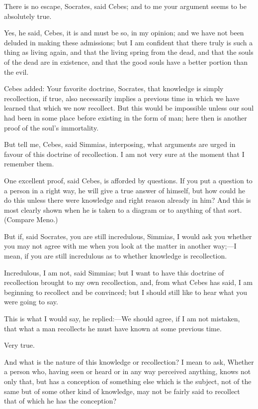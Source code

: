 There is no escape, Socrates, said Cebes; and to me your argument seems to
be absolutely true.

Yes, he said, Cebes, it is and must be so, in my opinion; and we have not
been deluded in making these admissions; but I am confident that there
truly is such a thing as living again, and that the living spring from the
dead, and that the souls of the dead are in existence, and that the good
souls have a better portion than the evil.

Cebes added: Your favorite doctrine, Socrates, that knowledge is simply
recollection, if true, also necessarily implies a previous time in which
we have learned that which we now recollect. But this would be impossible
unless our soul had been in some place before existing in the form of man;
here then is another proof of the soul's immortality.

But tell me, Cebes, said Simmias, interposing, what arguments are urged in
favour of this doctrine of recollection. I am not very sure at the moment
that I remember them.

One excellent proof, said Cebes, is afforded by questions. If you put a
question to a person in a right way, he will give a true answer of
himself, but how could he do this unless there were knowledge and right
reason already in him? And this is most clearly shown when he is taken to
a diagram or to anything of that sort. (Compare Meno.)

But if, said Socrates, you are still incredulous, Simmias, I would ask you
whether you may not agree with me when you look at the matter in another
way;—I mean, if you are still incredulous as to whether knowledge is
recollection.

Incredulous, I am not, said Simmias; but I want to have this doctrine of
recollection brought to my own recollection, and, from what Cebes has
said, I am beginning to recollect and be convinced; but I should still
like to hear what you were going to say.

This is what I would say, he replied:—We should agree, if I am not
mistaken, that what a man recollects he must have known at some previous
time.

Very true.

And what is the nature of this knowledge or recollection? I mean to ask,
Whether a person who, having seen or heard or in any way perceived
anything, knows not only that, but has a conception of something else
which is the subject, not of the same but of some other kind of knowledge,
may not be fairly said to recollect that of which he has the conception?

